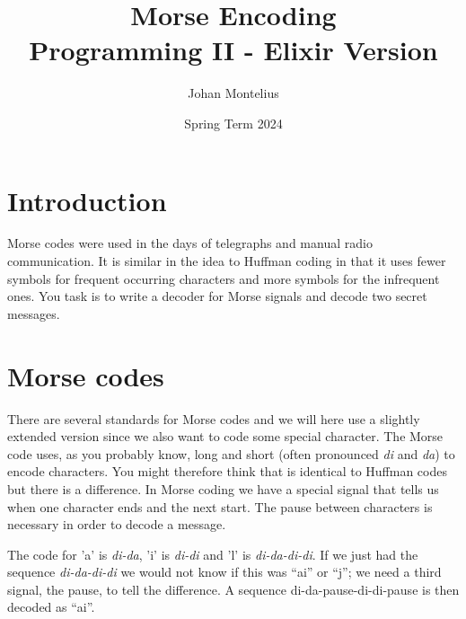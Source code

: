 \documentclass[a4paper,11pt]{article}
\begin{document}

\title{
    \textbf{Morse Encoding}\\
    \large{Programming II - Elixir Version}
}
\author{Johan Montelius}
\date{Spring Term 2024}
\maketitle
{}



\section*{Introduction}

Morse codes were used in the days of telegraphs and manual radio
communication. It is similar in the idea to Huffman coding in that it
uses fewer symbols for frequent occurring characters and more symbols
for the infrequent ones. You task is to write a decoder for Morse
signals and decode two secret messages.   



\section{Morse codes}

There are several standards for Morse codes and we will here use a
slightly extended version since we also want to code some special
character. The Morse code uses, as you probably know, long and short
(often pronounced {\em di} and {\em da}) to encode characters. You
might therefore think that is identical to Huffman codes but there is
a difference. In Morse coding we have a special signal that tells us
when one character ends and the next start. The pause between
characters is necessary in order to decode a message.

The code for 'a' is {\em di-da}, 'i' is {\em di-di} and 'l' is {\em di-da-di-di}.  If
we just had the sequence {\em di-da-di-di} we would not know if this
was ``ai'' or ``j''; we need a third signal, the pause, to tell the
difference. A sequence {di-da-pause-di-di-pause} is then decoded as ``ai''.
\end{document}
